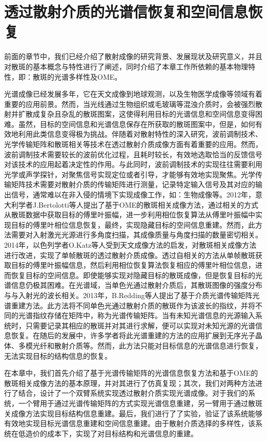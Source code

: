 
\chapter{透过散射介质的光谱信恢复和空间信息恢复}
前面的章节中，我们已经介绍了散射成像的研究背景、发展现状及研究意义，并且对散斑的基本概念与特性进行了阐述，同时介绍了本章工作所依赖的基本物理特性，即：散斑的光谱多样性及OME。

光谱成像已经发展多年，它在天文成像到地球观测，以及生物医学成像等领域有着重要的应用前景。然而，当光线通过生物组织或毛玻璃等混浊介质时，会被强烈散射并扩散成复杂且杂乱的散斑图案，这使得利用目标的光谱信息和空间信息变得困难。虽然，目标的空间信息和光谱信息保存在所获取的散斑图案中，但是，如何有效地利用此类信息变得极为挑战。伴随着对散射特性的深入研究，波前调制技术、光学传输矩阵和散斑相关等技术在透过散射介质成像方面有着重要的应用。然而，波前调制技术需要较长的波前优化过程，且耗时较长，有效地选取恰当的反馈信号对该技术的应用起着决定性的作用。与此同时，波前调制技术的实现往往需要利用光学或声学探针，对聚焦信号实现定位或者引导，才能够有效地实现聚焦。光学传输矩阵技术需要对散射介质的传输矩阵进行测量，记录特定输入信号及其对应的输出信号，通常难以在非入侵的情境下实现成像工作，如：生物成像等。2012年，意大利学者J.Bertolotti等人\cite{bertolotti_non-invasive_2012}提出了基于OME\cite{Freund1988,Yllmaz2019}的散斑相关成像方法，通过相关的方式从散斑数据中获取目标的傅里叶振幅，进一步利用相位恢复算法从傅里叶振幅中实现目标的傅里叶相位信息恢复，最终，实现隐藏目标的空间信息重建。然而，此方法需要对入射激光光源进行多角度扫描，其成像质量与角度扫描的数量密切相关。2014年，以色列学者O.Katz等人\cite{katz_non-invasive_2014}受到天文成像方法的启发，对散斑相关成像方法进行改进，实现了单帧散斑的透过散射介质成像。透过自相关的方法从单帧散斑获取目标的傅里叶振幅信息，然后利用相位恢复算法恢复相应的傅里叶相位信息，进而恢复目标的空间信息。即使能够实现对隐藏目标的散斑成像，但是恢复目标的光谱信息仍极其困难。在光谱域，当单色光通过散射介质后，其散斑图像的强度分布与与入射光的波长相关。2013年，B.Redding等人提出了基于介质光谱传输矩阵光谱重建方法。此方法将不同单色光通过散射介质的散斑作为该波长的指纹，并将不同的光谱指纹存储在矩阵中，称为光谱传输矩阵。当有未知光谱信息的光源输入系统时，只需要记录其相应的散斑并对其进行求解，便可以实现对未知光源的光谱信息恢复。在随后的发展中，许多学者将此光谱重建的方法的应用扩展到无序光子晶体、多模光纤和散射介质等。然而，此方法只能对目标信息的光谱信息进行恢复，无法实现目标的结构信息的恢复。

在本章中，我们首先介绍了基于光谱传输矩阵的光谱信息恢复方法和基于OME的散斑相关成像方法的基本原理，并对其进行了仿真复现；其次，我们对两种方法进行了结合，设计了一个双臂系统实现透过散射介质实现光谱成像。对于我们的系统，一个臂用于通过光谱传输矩阵的方式实现光谱信息重建，另一臂用于通过散斑关成像方法实现目标结构信息重建。最后，我们进行了了实验，验证了该系统能够有效地实现目标光谱信息重建和空间信息重建。由于散射介质选择的多样性，该系统在低造价的成本下，实现了对目标结构和光谱信息的重建。

